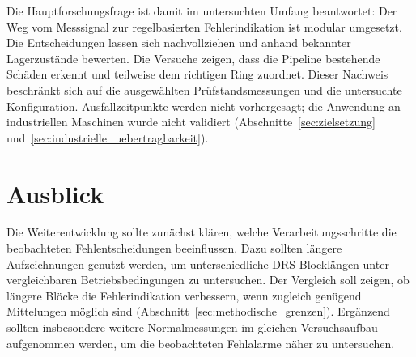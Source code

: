 Die Hauptforschungsfrage ist damit im untersuchten Umfang beantwortet:
Der Weg vom Messsignal zur regelbasierten Fehlerindikation ist modular
umgesetzt. Die Entscheidungen lassen sich nachvollziehen und anhand
bekannter Lagerzustände bewerten. Die Versuche zeigen, dass die Pipeline
bestehende Schäden erkennt und teilweise dem richtigen Ring zuordnet.
Dieser Nachweis beschränkt sich auf die ausgewählten Prüfstandsmessungen
und die untersuchte Konfiguration. Ausfallzeitpunkte werden nicht
vorhergesagt; die Anwendung an industriellen Maschinen wurde nicht
validiert
(Abschnitte~\ref{sec:zielsetzung} und~\ref{sec:industrielle_uebertragbarkeit}).

\section{Ausblick}
\label{sec:ausblick}

Die Weiterentwicklung sollte zunächst klären, welche Verarbeitungsschritte
die beobachteten Fehlentscheidungen beeinflussen. Dazu sollten
längere Aufzeichnungen genutzt werden, um unterschiedliche DRS-Blocklängen
unter vergleichbaren Betriebsbedingungen zu untersuchen. Der Vergleich
soll zeigen, ob längere Blöcke die Fehlerindikation verbessern, wenn
zugleich genügend Mittelungen möglich sind
(Abschnitt~\ref{sec:methodische_grenzen}).
Ergänzend sollten insbesondere weitere Normalmessungen im gleichen
Versuchsaufbau aufgenommen werden, um die beobachteten Fehlalarme näher
zu untersuchen.

